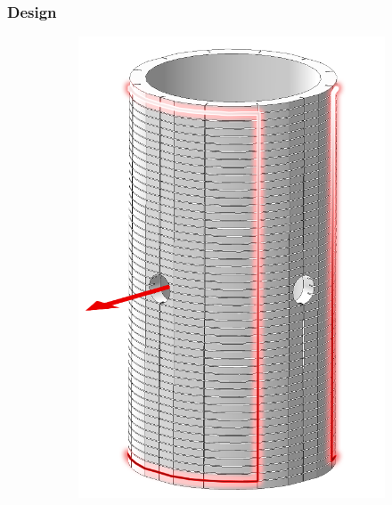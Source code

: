 \documentclass[PaulGanssle-Thesis.tex]{subfiles}
\begin{document}
\subsubsection{Design}
\label{mag.design.shim.coils.design}
\begin{figure}[ht!]
\centering
\begin{subfigure}[b]{0.3\textwidth}
\centering
\includegraphics[width=\textwidth]{figures/magnetometer/FieldCoilX.png}
\caption{}
\label{fig:FieldCoilX}
\end{subfigure}
\begin{subfigure}[b]{0.3\textwidth}
\centering

\end{subfigure}
\end{figure}
\end{document}
